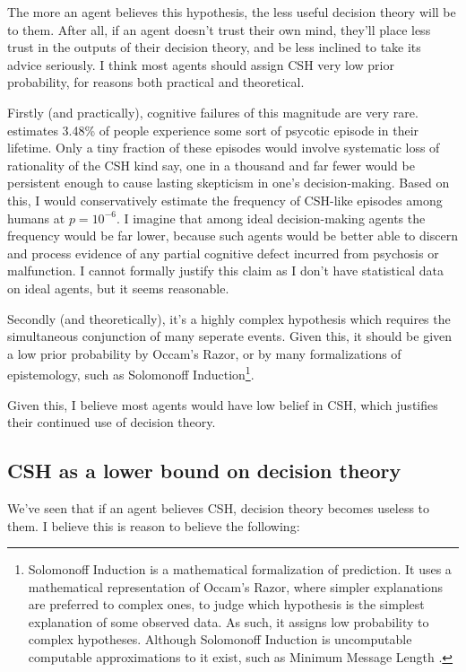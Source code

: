 \documentclass{article}
\begin{document}
The more an agent believes this hypothesis, the less useful decision theory will be to them. After all, if an agent doesn't trust their own mind, they'll place less trust in the outputs of their decision theory, and be less inclined to take its advice seriously. I think most agents should assign CSH very low prior probability, for reasons both practical and theoretical.

Firstly (and practically), cognitive failures of this magnitude are very rare. \citep{perala2007lifetime} estimates 3.48\% of people experience some sort of psycotic episode in their lifetime. Only a tiny fraction of these episodes would involve systematic loss of rationality of the CSH kind \textemdash{} say, one in a thousand \textemdash{} and far fewer would be persistent enough to cause lasting skepticism in one's decision-making. Based on this, I would conservatively estimate the frequency of CSH-like episodes among humans at \(p = 10^{-6}\). I imagine that among ideal decision-making agents the frequency would be far lower, because such agents would be better able to discern and process evidence of any partial cognitive defect incurred from psychosis or malfunction. I cannot formally justify this claim as I don't have statistical data on ideal agents, but it seems reasonable.

Secondly (and theoretically), it's a highly complex hypothesis which requires the simultaneous conjunction of many seperate events. Given this, it should be given a low prior probability by Occam's Razor, or by many formalizations of epistemology, such as Solomonoff Induction\footnote{Solomonoff Induction \citep{solomonoff1964formal} is a mathematical formalization of prediction. It uses a mathematical representation of Occam's Razor, where simpler explanations are preferred to complex ones, to judge which hypothesis is the simplest explanation of some observed data. As such, it assigns low probability to complex hypotheses. Although Solomonoff Induction is uncomputable computable approximations to it exist, such as Minimum Message Length \citep{wallace1999minimum}.}.

Given this, I believe most agents would have low belief in CSH, which justifies their continued use of decision theory.

\subsection{CSH as a lower bound on decision theory}

We've seen that if an agent believes CSH, decision theory becomes useless to them. I believe this is reason to believe the following:
\end{document}
